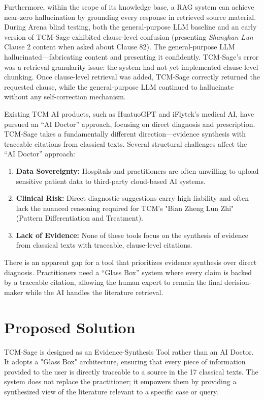 \documentclass[11pt,a4paper]{report}
\begin{document}
Furthermore, within the scope of its knowledge base, a RAG system can achieve near-zero hallucination by grounding every response in retrieved source material. During Arena blind testing, both the general-purpose LLM baseline and an early version of TCM-Sage exhibited clause-level confusion (presenting \textit{Shanghan Lun} Clause 2 content when asked about Clause 82). The general-purpose LLM hallucinated---fabricating content and presenting it confidently. TCM-Sage's error was a retrieval granularity issue: the system had not yet implemented clause-level chunking. Once clause-level retrieval was added, TCM-Sage correctly returned the requested clause, while the general-purpose LLM continued to hallucinate without any self-correction mechanism.

Existing TCM AI products, such as HuatuoGPT and iFlytek's medical AI, have pursued an ``AI Doctor'' approach, focusing on direct diagnosis and prescription. TCM-Sage takes a fundamentally different direction---evidence synthesis with traceable citations from classical texts. Several structural challenges affect the ``AI Doctor'' approach:
\begin{enumerate}
    \item \textbf{Data Sovereignty:} Hospitals and practitioners are often unwilling to upload sensitive patient data to third-party cloud-based AI systems.
    \item \textbf{Clinical Risk:} Direct diagnostic suggestions carry high liability and often lack the nuanced reasoning required for TCM's "Bian Zheng Lun Zhi" (Pattern Differentiation and Treatment).
    \item \textbf{Lack of Evidence:} None of these tools focus on the synthesis of evidence from classical texts with traceable, clause-level citations.
\end{enumerate}

There is an apparent gap for a tool that prioritizes evidence synthesis over direct diagnosis. Practitioners need a ``Glass Box'' system where every claim is backed by a traceable citation, allowing the human expert to remain the final decision-maker while the AI handles the literature retrieval.

\section{Proposed Solution}
TCM-Sage is designed as an Evidence-Synthesis Tool rather than an AI Doctor. It adopts a "Glass Box" architecture, ensuring that every piece of information provided to the user is directly traceable to a source in the 17 classical texts. The system does not replace the practitioner; it empowers them by providing a synthesized view of the literature relevant to a specific case or query.
\end{document}
